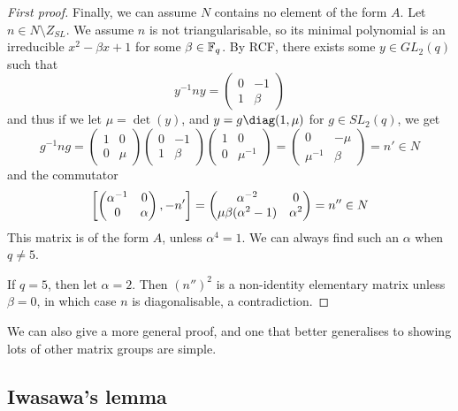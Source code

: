 \documentclass{article}
\begin{document}
\begin{theorem}
\begin{proof}[First proof]
        Finally, we can assume $N$ contains no element of the form $A$. Let $n\in N\setminus Z_{SL}$. We assume $n$ is not triangularisable, so its minimal polynomial is an irreducible $x^2-\beta x + 1$ for some $\beta \in \mathbb{F}_q$. By RCF, there exists some $y\in GL_2(q)$ such that \[
        y^{-1}ny = \begin{pmatrix}
            0 & -1 \\ 1 & \beta
        \end{pmatrix}
        \] and thus if we let $\mu = \det(y)$, and $y=g\diag(1,\mu)$ for $g\in SL_2(q)$, we get \[
        g^{-1}ng = \begin{pmatrix}
            1 & 0 \\ 0 & \mu
        \end{pmatrix}\begin{pmatrix}
            0 & -1 \\ 1 & \beta
        \end{pmatrix}\begin{pmatrix}
            1 & 0 \\ 0 & \mu^{-1}
        \end{pmatrix} = \begin{pmatrix}
            0 & -\mu \\ \mu^{-1} & \beta
        \end{pmatrix} = n'\in N
        \] and the commutator \[
        \left[ 
            \begin{pmatrix} 
                \alpha^{-1} & 0 \\ 0 & \alpha 
            \end{pmatrix},-n'
         \right] = \begin{pmatrix}
            \alpha^{-2} & 0 \\ \mu\beta(\alpha^2-1) & \alpha^2
        \end{pmatrix} = n''\in N
        \] This matrix is of the form $A$, unless $\alpha^4=1$. We can always find such an $\alpha$ when $q\neq 5$.

        If $q=5$, then let $\alpha = 2$. Then $(n'')^2$ is a non-identity elementary matrix unless $\beta = 0$, in which case $n$ is diagonalisable, a contradiction.
    \end{proof}
\end{theorem}

We can also give a more general proof, and one that better generalises to showing lots of other matrix groups are simple.

\subsection{Iwasawa's lemma}
\end{document}

